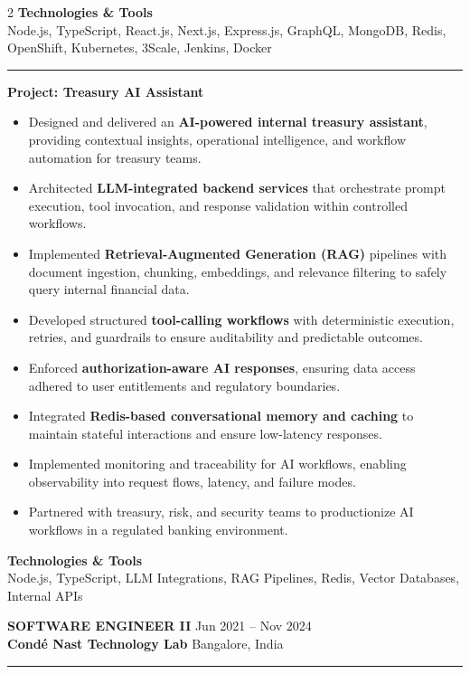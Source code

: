 \documentclass[10pt,a4paper]{article}
\newcommand{\blockdivider}{\vspace{0pt}\color{rulecolor}\rule{\linewidth}{0.5pt}\color{primary}\vspace{4pt}}
\newcommand{\roleheader}[4]{%
  \noindent
  \textbf{\MakeUppercase{#3}}%
  \hfill
  \textcolor{secondary}{#4}\\[0pt]
  \noindent
  \textbf{#1}%
  \hfill
  \textcolor{secondary}{#2}\\[0pt]
}
\newcommand{\roledivider}{%
  \vspace{-1pt}%
  {\color{rulecolor}\rule{\linewidth}{0.5pt}}%
  \vspace{2pt}%
}
\newcommand{\projecttitle}[1]{\textbf{#1}\par\vspace{2pt}}
\begin{document}
\begin{paracol}{2}
\textbf{Technologies \& Tools}\\
Node.js, TypeScript, React.js, Next.js, Express.js, GraphQL, MongoDB, Redis, OpenShift, Kubernetes, 3Scale, Jenkins, Docker

\blockdivider

\projecttitle{Project: Treasury AI Assistant}
\begin{itemize}
  \item Designed and delivered an \textbf{AI-powered internal treasury assistant}, providing contextual insights, operational intelligence, and workflow automation for treasury teams.
  \item Architected \textbf{LLM-integrated backend services} that orchestrate prompt execution, tool invocation, and response validation within controlled workflows.
  \item Implemented \textbf{Retrieval-Augmented Generation (RAG)} pipelines with document ingestion, chunking, embeddings, and relevance filtering to safely query internal financial data.
  \item Developed structured \textbf{tool-calling workflows} with deterministic execution, retries, and guardrails to ensure auditability and predictable outcomes.
  \item Enforced \textbf{authorization-aware AI responses}, ensuring data access adhered to user entitlements and regulatory boundaries.
  \item Integrated \textbf{Redis-based conversational memory and caching} to maintain stateful interactions and ensure low-latency responses.
  \item Implemented monitoring and traceability for AI workflows, enabling observability into request flows, latency, and failure modes.
  \item Partnered with treasury, risk, and security teams to productionize AI workflows in a regulated banking environment.
\end{itemize}

\textbf{Technologies \& Tools}\\
Node.js, TypeScript, LLM Integrations, RAG Pipelines, Redis, Vector Databases, Internal APIs
\vspace{16pt}

\roleheader{Cond\'e Nast Technology Lab}{Bangalore, India}{Software Engineer II}{Jun 2021 -- Nov 2024}
\roledivider


\end{paracol}
\end{document}
